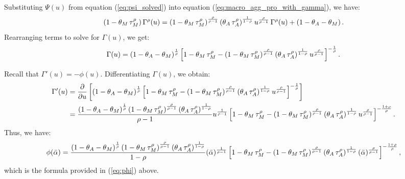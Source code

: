 Substituting \( \Psi(u) \) from equation (\ref{eq:psi_solved}) into equation (\ref{eq:macro_agg_pro_with_gamma}), we have:
\[
\left(1-\theta_{M}\,\tau_{M}^{\rho}\right)\Gamma^{\rho}(u)=\left(1-\theta_{M}\,\tau_{M}^{\rho}\right)^{\frac{\rho}{\rho-1}}\left(\theta_{A}\,\tau_{A}^{\rho}\right)^{\frac{1}{1-\rho}}u^{\frac{\rho}{\rho-1}}\,\Gamma^{\rho}(u)+\left(1-\theta_{A}-\theta_{M}\right).
\]
Rearranging terms to solve for \( \Gamma(u) \), we get:
\[
\Gamma(u)=\left(1-\theta_{A}-\theta_{M}\right)^{\frac{1}{\rho}}\left[1-\theta_{M}\,\tau_{M}^{\rho}-\left(1-\theta_{M}\,\tau_{M}^{\rho}\right)^{\frac{\rho}{\rho-1}}\left(\theta_{A}\,\tau_{A}^{\rho}\right)^{\frac{1}{1-\rho}}u^{\frac{\rho}{\rho-1}}\right]^{-\frac{1}{\rho}}.
\]

Recall that \( \Gamma'(u)=-\phi(u) \).
Differentiating \( \Gamma(u) \), we obtain:
\begin{align*}
\Gamma'(u)&=\frac{\partial}{\partial u}\left[\left(1-\theta_{A}-\theta_{M}\right)^{\frac{1}{\rho}}\left[1-\theta_{M}\,\tau_{M}^{\rho}-\left(1-\theta_{M}\,\tau_{M}^{\rho}\right)^{\frac{\rho}{\rho-1}}\left(\theta_{A}\,\tau_{A}^{\rho}\right)^{\frac{1}{1-\rho}}u^{\frac{\rho}{\rho-1}}\right]^{-\frac{1}{\rho}}\right] \\
&=\frac{\left(1-\theta_{A}-\theta_{M}\right)^{\frac{1}{\rho}}\left(1-\theta_{M}\,\tau_{M}^{\rho}\right)^{\frac{\rho}{\rho-1}}\left(\theta_{A}\,\tau_{A}^{\rho}\right)^{\frac{1}{1-\rho}}}{\rho-1}u^{\frac{1}{\rho-1}}\left[1-\theta_{M}\,\tau_{M}^{\rho}-\left(1-\theta_{M}\,\tau_{M}^{\rho}\right)^{\frac{\rho}{\rho-1}}\left(\theta_{A}\,\tau_{A}^{\rho}\right)^{\frac{1}{1-\rho}}u^{\frac{\rho}{\rho-1}}\right]^{-\frac{1+\rho}{\rho}}.
\end{align*}
Thus, we have:
\begin{equation}
\phi(\bar{\alpha})=\frac{\left(1-\theta_{A}-\theta_{M}\right)^{\frac{1}{\rho}}\left(1-\theta_{M}\,\tau_{M}^{\rho}\right)^{\frac{\rho}{\rho-1}}\left(\theta_{A}\,\tau_{A}^{\rho}\right)^{\frac{1}{1-\rho}}}{1-\rho}(\bar{\alpha})^{\frac{1}{\rho-1}}\left[1-\theta_{M}\,\tau_{M}^{\rho}-\left(1-\theta_{M}\,\tau_{M}^{\rho}\right)^{\frac{\rho}{\rho-1}}\left(\theta_{A}\,\tau_{A}^{\rho}\right)^{\frac{1}{1-\rho}}(\bar{\alpha})^{\frac{\rho}{\rho-1}}\right]^{-\frac{1+\rho}{\rho}},
\end{equation}
which is the formula provided in (\ref{eq:phi}) above.
